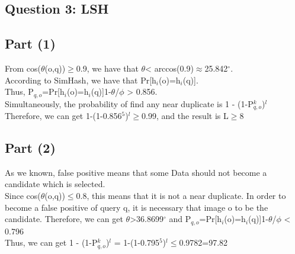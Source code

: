 \documentclass{article}
\begin{document}
\begin{itemize}
\section*{Question 3: LSH}
\subsection*{Part (1)}
From cos($\theta$(o,q))$\geq$0.9, we have that $\theta$< arccos(0.9)$\approx$25.842$^\circ$. \\
According to SimHash, we have that Pr[h$_{i}$(o)=h$_{i}$(q)].\\ Thus, P$_{q,o}$=Pr[h$_{i}$(o)=h$_{i}$(q)]1-$\theta$/$\phi$ > 0.856.\\
Simultaneously, the probability of find any near duplicate is 1 - (1-P$^{k}_{q,o}$)$^{l}$
Therefore, we can get 1-(1-0.856$^5$)$^{l}$$\geq$0.99, and the result is L$\geq$8
\subsection*{Part (2)}
As we known, false positive means that some Data should not become a candidate which is selected.\\
Since cos($\theta$(o,q))$\leq$0.8, this means that it is not a near duplicate. In order to become a false positive of query q, it is necessary that image o to be the candidate. Therefore, we can get $\theta$>36.8699$^\circ$ and P$_{q,o}$=Pr[h$_{i}$(o)=h$_{i}$(q)]1-$\theta$/$\phi$ < 0.796\\
Thus, we can get 1 - (1-P$^{k}_{q,o}$)$^{l}$ = 1-(1-0.795$^5$)$^{l}$$\leq$0.9782=97.82%
\end{itemize}
\end{document}

